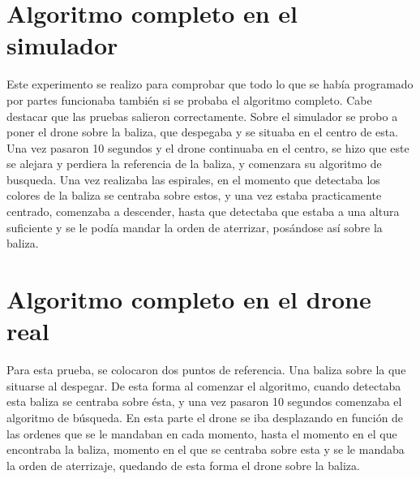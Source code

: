 \section{Algoritmo completo en el simulador}
\hspace{1cm} Este experimento se realizo para comprobar que todo lo que se hab\'ia programado por partes funcionaba tambi\'en si se probaba el algoritmo completo. Cabe destacar que las pruebas salieron correctamente. Sobre el simulador se probo a poner el drone sobre la baliza, que despegaba y se situaba en el centro de esta. Una vez pasaron 10 segundos y el drone continuaba en el centro, se hizo que este se alejara y perdiera la referencia de la baliza, y comenzara su algoritmo de busqueda. Una vez realizaba las espirales, en el momento que detectaba los colores de la baliza se centraba sobre estos, y una vez estaba practicamente centrado, comenzaba a descender, hasta que detectaba que estaba a una altura suficiente y se le pod\'ia mandar la orden de aterrizar, pos\'andose as\'i sobre la baliza. 

\section{Algoritmo completo en el drone real}
\hspace{1cm} Para esta prueba, se colocaron dos puntos de referencia. Una baliza sobre la que situarse al despegar. De esta forma al comenzar el algoritmo, cuando detectaba esta baliza se centraba sobre \'esta, y una vez pasaron 10 segundos comenzaba el algoritmo de b\'usqueda. En esta parte el drone se iba desplazando en funci\'on de las ordenes que se le mandaban en cada momento, hasta el momento en el que encontraba la baliza, momento en el que se centraba sobre esta y se le mandaba la orden de aterrizaje, quedando de esta forma el drone sobre la baliza. 



